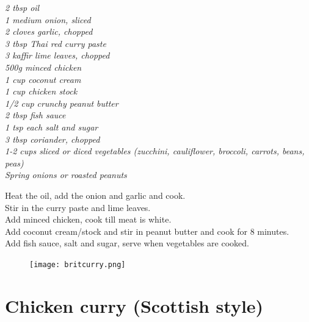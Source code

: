 \documentclass{tufte-book}
\begin{document}
\emph{2 tbsp oil
\\1 medium onion, sliced
\\2 cloves garlic, chopped
\\3 tbsp Thai red curry paste
\\3 kaffir lime leaves, chopped
\\500g minced chicken
\\1 cup coconut cream
\\1 cup chicken stock
\\1/2 cup crunchy peanut butter
\\2 tbsp fish sauce
\\1 tsp each salt and sugar
\\3 tbsp coriander, chopped
\\1-2 cups sliced or diced vegetables (zucchini, cauliflower, broccoli, carrots, beans, peas)
\\Spring onions or roasted peanuts}

Heat the oil, add the onion and garlic and cook.
\\Stir in the curry paste and lime leaves.
\\Add minced chicken, cook till meat is white.
\\Add coconut cream/stock and stir in peanut butter and cook for 8 minutes.
\\Add fish sauce, salt and sugar, serve when vegetables are cooked.


\begin{figure}[h]
  \texttt{[image: britcurry.png]}%
\end{figure}

\section{Chicken curry (Scottish style)}
\end{document}
